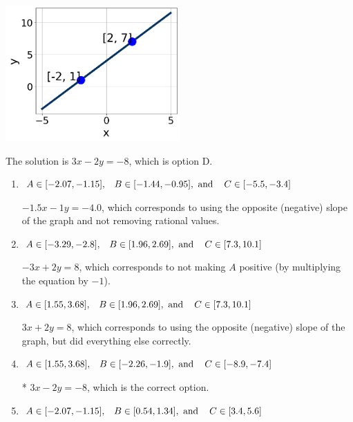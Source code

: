 \documentclass{extbook}[14pt]
\begin{document}
\begin{enumerate}
{\begin{center}
    \includegraphics[width=0.5\textwidth]{../Figures/linearGraphToStandardC.png}
\end{center}


The solution is \( 3x - 2y = -8 \), which is option D.\begin{enumerate}[label=\Alph*.]
\item \( A \in [-2.07, -1.15], \hspace{3mm} B \in [-1.44, -0.95], \text{ and } \hspace{3mm} C \in [-5.5, -3.4] \)

 $-1.5x - 1y = -4.0$, which corresponds to using the opposite (negative) slope of the graph and not removing rational values.
\item \( A \in [-3.29, -2.8], \hspace{3mm} B \in [1.96, 2.69], \text{ and } \hspace{3mm} C \in [7.3, 10.1] \)

 $-3x + 2y = 8$, which corresponds to not making $A$ positive (by multiplying the equation by $-1$).
\item \( A \in [1.55, 3.68], \hspace{3mm} B \in [1.96, 2.69], \text{ and } \hspace{3mm} C \in [7.3, 10.1] \)

 $3x + 2y = 8$, which corresponds to using the opposite (negative) slope of the graph, but did everything else correctly.
\item \( A \in [1.55, 3.68], \hspace{3mm} B \in [-2.26, -1.9], \text{ and } \hspace{3mm} C \in [-8.9, -7.4] \)

* $3x - 2y = -8$, which is the correct option.
\item \( A \in [-2.07, -1.15], \hspace{3mm} B \in [0.54, 1.34], \text{ and } \hspace{3mm} C \in [3.4, 5.6] \)


\end{enumerate}}
\end{enumerate}
\end{document}
